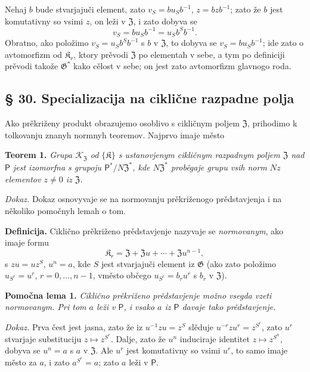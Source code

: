 \documentclass[11pt]{article}
\begin{document}
Nehaj \(b\) bude stvarjajuči element, zato \(v_S=bu_Sb^{-1}\), \(z=bzb^{-1}\); zato že \(b\) jest komutativny so vsimi \(z\), on leži v \(\mathfrak Z\), i zato dobyva se
\[
v_S=bu_Sb^{-1}=u_Sb^Sb^{-1}.
\]
Obratno, ako položimo \(v_S=u_Sb^Sb^{-1}\) s \(b\) v \(\mathfrak Z\), to dobyva se \(v_S=bu_Sb^{-1}\); ide zato o avtomorfizm od \(\mathfrak K_r\), ktory prěvodi \(\mathfrak Z\) po elementah v sebe, a tym po definiciji prěvodi takože \(\mathfrak G^*\) kako cělost v sebe; on jest zato avtomorfizm glavnogo roda.

\subsection*{§ 30. Specializacija na ciklične razpadne polja}\label{spezialisierung-auf-zyklische-zerfaellungskoerper}

Ako prěkriženy produkt obrazujemo osoblivo s cikličnym poljem \(\mathfrak Z\), prihodimo k tolkovanju znanyh normnyh teoremov. Najprvo imaje město

\noindent\textbf{Teorem 1.} \emph{Grupa \(\mathscr K_{\mathfrak Z}\) od \(\{\mathfrak K\}\) s ustanovjenym cikličnym razpadnym poljem \(\mathfrak Z\) nad \(\mathsf{P}\) jest izomorfna s grupoju \(\mathsf{P}^*/N\mathfrak Z^*\), kde \(N\mathfrak Z^*\) proběgaje grupu vsih norm \(Nz\) elementov \(z\neq0\) iz \(\mathfrak Z\).}

\noindent\emph{Dokaz.} Dokaz osnovyvaje se na normovanju prěkriženogo prědstavjenja i na několiko pomočnyh lemah o tom.

\noindent\textbf{Definicija.} Ciklično prěkriženo prědstavjenje nazyvaje se \emph{normovanym}, ako imaje formu
\[
\mathfrak K_r=\mathfrak Z+\mathfrak Zu+\cdots+\mathfrak Zu^{n-1},
\]
s \(zu=uz^S\), \(u^n=a\), kde \(S\) jest stvarjajuči element iz \(\mathfrak G\) (ako zato položimo \(u_{S^r}=u^r\), \(r=0,\ldots,n-1\), vměsto občego \(u_{S^r}=b_ru^r\) s \(b_r\) v \(\mathfrak Z\)).

\noindent\textbf{Pomočna lema 1.} \emph{Ciklično prěkriženo prědstavjenje možno vsegda vzeti normovanym. Pri tom \(a\) leži v \(\mathsf{P}\), i vsako \(a\) iz \(\mathsf{P}\) davaje tako prědstavjenje.}

\noindent\emph{Dokaz.} Prva čest jest jasna, zato že iz \(u^{-1}zu=z^S\) slěduje \(u^{-r}zu^r=z^{S^r}\), zato \(u^r\) stvarjaje substituciju \(z\mapsto z^{S^r}\). Dalje, zato že \(u^n\) induciraje identitet \(z\mapsto z^{S^n}\), dobyva se \(u^n=a\) s \(a\) v \(\mathfrak Z\). Ale \(u^r\) jest komutativny so vsimi \(u^r\), to samo imaje město za \(a\), i zato \(a^{S^r}=a\); zato \(a\) leži v \(\mathsf{P}\).
\end{document}
